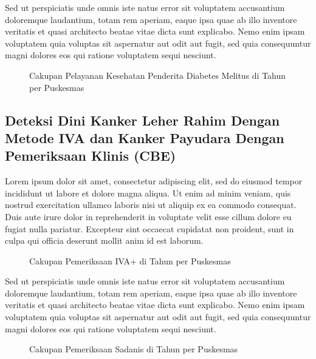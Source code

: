 Sed ut perspiciatis unde omnis iste natus error sit voluptatem accusantium doloremque laudantium, totam rem aperiam, eaque ipsa quae ab illo inventore veritatis et quasi architecto beatae vitae dicta sunt explicabo. Nemo enim ipsam voluptatem quia voluptas sit aspernatur aut odit aut fugit, sed quia consequuntur magni dolores eos qui ratione voluptatem sequi nesciunt.

\begin{figure}[H]
  \centering
  \caption{Cakupan Pelayanan Kesehatan Penderita Diabetes Melitus di \namaKabupaten Tahun \tP per Puskesmas}
  \label{fig:Pelayanan-DM}
\end{figure}

\subsection{Deteksi Dini Kanker Leher Rahim Dengan Metode IVA dan Kanker Payudara Dengan Pemeriksaan Klinis (CBE)}
Lorem ipsum dolor sit amet, consectetur adipiscing elit, sed do eiusmod tempor incididunt ut labore et dolore magna aliqua. Ut enim ad minim veniam, quis nostrud exercitation ullamco laboris nisi ut aliquip ex ea commodo consequat. Duis aute irure dolor in reprehenderit in voluptate velit esse cillum dolore eu fugiat nulla pariatur. Excepteur sint occaecat cupidatat non proident, sunt in culpa qui officia deserunt mollit anim id est laborum.

\begin{figure}[H]
	\centering
	\caption{Cakupan Pemeriksaan IVA+ di \namaKabupaten Tahun \tP per Puskesmas}
	\label{fig:Pemeriksaan-IVA}
\end{figure}

Sed ut perspiciatis unde omnis iste natus error sit voluptatem accusantium doloremque laudantium, totam rem aperiam, eaque ipsa quae ab illo inventore veritatis et quasi architecto beatae vitae dicta sunt explicabo. Nemo enim ipsam voluptatem quia voluptas sit aspernatur aut odit aut fugit, sed quia consequuntur magni dolores eos qui ratione voluptatem sequi nesciunt.

\begin{figure}[H]
	\centering
	\caption{Cakupan Pemeriksaan Sadanis di \namaKabupaten Tahun \tP per Puskesmas}
	\label{fig:Pemeriksaan-Sadanis}
\end{figure}


